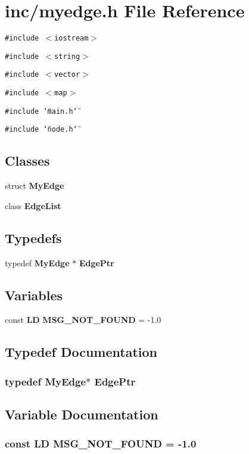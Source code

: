 \section{inc/myedge.h File Reference}
\label{myedge_8h}
{\tt \#include $<$iostream$>$}\par
{\tt \#include $<$string$>$}\par
{\tt \#include $<$vector$>$}\par
{\tt \#include $<$map$>$}\par
{\tt \#include \char`\"{}main.h\char`\"{}}\par
{\tt \#include \char`\"{}node.h\char`\"{}}\par
\subsection*{Classes}
\begin{CompactItemize}
\item 
struct {\bf MyEdge}
\item 
class {\bf EdgeList}
\end{CompactItemize}
\subsection*{Typedefs}
\begin{CompactItemize}
\item 
typedef {\bf MyEdge} $\ast$ {\bf EdgePtr}
\end{CompactItemize}
\subsection*{Variables}
\begin{CompactItemize}
\item 
const {\bf LD} {\bf MSG\_\-NOT\_\-FOUND} = -1.0
\end{CompactItemize}


\subsection{Typedef Documentation}
\subsubsection{\setlength{\rightskip}{0pt plus 5cm}typedef {\bf MyEdge}$\ast$ {\bf EdgePtr}}\label{myedge_8h_bbd0a1c7c4c780030aa685ac41818d5a}




\subsection{Variable Documentation}
\subsubsection{\setlength{\rightskip}{0pt plus 5cm}const {\bf LD} {\bf MSG\_\-NOT\_\-FOUND} = -1.0}\label{myedge_8h_deca567aba899e2fc12596d990db2153}


